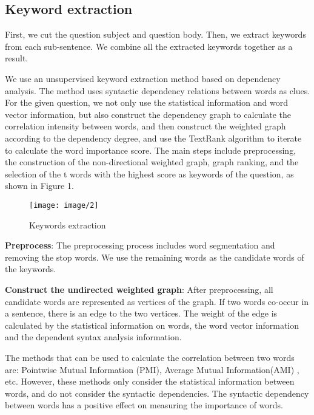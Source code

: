 \documentclass[11pt,a4paper]{article}
\begin{document}
\subsection{Keyword extraction}
First, we cut the question subject and question body. Then, we extract keywords from each sub-sentence. We combine all the extracted keywords together as a result.

We use an unsupervised keyword extraction method based on dependency analysis. The method uses syntactic dependency relations between words as clues. For the given question, we not only use the statistical information and word vector information, but also construct the dependency graph to calculate the correlation intensity between words, and then construct the weighted graph according to the dependency degree, and use the TextRank algorithm \cite{Mihalcea2004TextRank} to iterate to calculate the word importance score. The main steps include preprocessing, the construction of the non-directional weighted graph, graph ranking, and the selection of the t words with the highest score as keywords of the question, as shown in Figure 1.

\begin{figure}[h]
	\begin{center}		
		\texttt{[image: image/2]}
		\caption{Keywords extraction}	
	\end{center} 
\end{figure}

{\bf Preprocess}: The preprocessing process includes word segmentation and removing the stop words. We use the remaining words as the candidate words of the keywords.

{\bf Construct the undirected weighted graph}: After preprocessing, all candidate words are represented as vertices of the graph. If two words co-occur in a sentence, there is an edge to the two vertices. The weight of the edge is calculated by the statistical information on words, the word vector information and the dependent syntax analysis information.

The methods that can be used to calculate the correlation between two words are: Pointwise Mutual Information (PMI), Average Mutual Information(AMI) \cite{Terra2004Frequency}, etc. However, these methods only consider the statistical information between words, and do not consider the syntactic dependencies. The syntactic dependency between words has a positive effect on measuring the importance of words.
\end{document}
